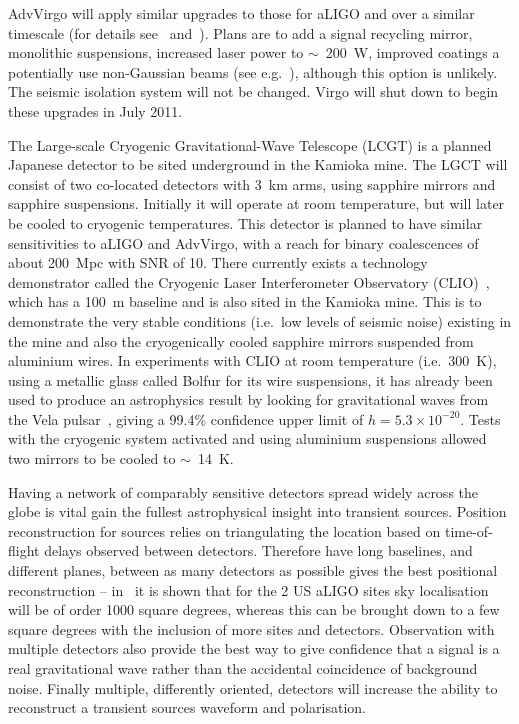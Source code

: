\documentclass{article}
\begin{document}
AdvVirgo will apply similar upgrades to those for aLIGO and over a similar
timescale (for details see~\cite{AdVwhitepaper} and~\cite{AdVdesign}). Plans are
to add a signal recycling mirror, monolithic suspensions, increased laser power
to $\sim$~200~W, improved coatings a potentially use non-Gaussian beams (see
e.g.~\cite{Freise:2010}), although this option is unlikely. The seismic isolation
system will not be changed. Virgo will shut down to begin these upgrades in July
2011.

The Large-scale Cryogenic Gravitational-Wave Telescope (LCGT)
\cite{Miyoki:2005, Ohashi:2008} is a planned Japanese detector to be sited
underground in the Kamioka mine. The LGCT will consist of two co-located
detectors with 3~km arms, using sapphire mirrors and sapphire suspensions.
Initially it will operate at room temperature, but will later be cooled to
cryogenic temperatures. This detector is planned to have similar sensitivities
to aLIGO and AdvVirgo, with a reach for binary coalescences of about 200~Mpc
with SNR of 10. There currently exists a technology demonstrator called the
Cryogenic Laser Interferometer Observatory (CLIO)~\cite{Yamamoto:2008, CLIOweb},
which has a 100~m baseline and is also sited in the Kamioka mine. This is to
demonstrate the very stable conditions (i.e.\ low levels of seismic noise)
existing in the mine and also the cryogenically cooled sapphire mirrors
suspended from aluminium wires. In experiments with CLIO at room temperature
(i.e.\ 300~K), using a metallic glass called Bolfur for its wire suspensions, it
has already been used to produce an astrophysics result by looking for
gravitational waves from the Vela pulsar~\cite{Akutsu:2008}, giving a 99.4\%
confidence upper limit of $h = 5.3\times10^{-20}$. Tests with the cryogenic
system activated and using aluminium suspensions allowed two mirrors to be
cooled to $\sim$~14~K.

Having a network of comparably sensitive detectors spread widely across the
globe is vital gain the fullest astrophysical insight into transient sources.
Position reconstruction for sources relies on triangulating the location based
on time-of-flight delays observed between detectors. Therefore have long
baselines, and different planes, between as many detectors as possible gives the
best positional reconstruction -- in~\cite{Fairhurst:2010} it is shown that for
the 2 US aLIGO sites sky localisation will be of order 1000 square degrees,
whereas this can be brought down to a few square degrees with the inclusion of
more sites and detectors. Observation with multiple detectors also provide the
best way to give confidence that a signal is a real gravitational wave rather
than the accidental coincidence of background noise. Finally multiple,
differently oriented, detectors will increase the ability to reconstruct a
transient sources waveform and polarisation.
\end{document}
